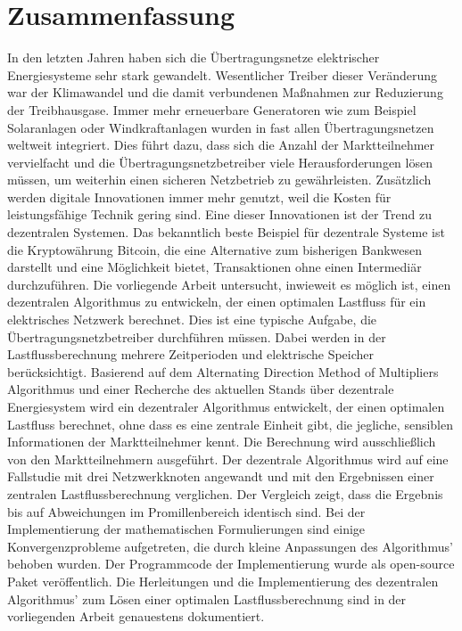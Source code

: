 \section*{Zusammenfassung}

In den letzten Jahren haben sich die Übertragungsnetze elektrischer Energiesysteme sehr stark gewandelt. Wesentlicher Treiber dieser Veränderung war der Klimawandel und die damit verbundenen Maßnahmen zur Reduzierung der Treibhausgase. Immer mehr erneuerbare Generatoren wie zum Beispiel Solaranlagen oder Windkraftanlagen wurden in fast allen Übertragungsnetzen weltweit integriert. Dies führt dazu, dass sich die Anzahl der Marktteilnehmer vervielfacht und die Übertragungsnetzbetreiber viele Herausforderungen lösen müssen, um weiterhin einen sicheren Netzbetrieb zu gewährleisten. Zusätzlich werden digitale Innovationen immer mehr genutzt, weil die Kosten für leistungsfähige Technik gering sind. Eine dieser Innovationen ist der Trend zu dezentralen Systemen. Das bekanntlich beste Beispiel für dezentrale Systeme ist die Kryptowährung Bitcoin, die eine Alternative zum bisherigen Bankwesen darstellt und eine Möglichkeit bietet, Transaktionen ohne einen Intermediär durchzuführen. Die vorliegende Arbeit untersucht, inwieweit es möglich ist, einen dezentralen Algorithmus zu entwickeln, der einen optimalen Lastfluss für ein elektrisches Netzwerk berechnet. Dies ist eine typische Aufgabe, die Übertragungsnetzbetreiber durchführen müssen. Dabei werden in der Lastflussberechnung mehrere Zeitperioden und elektrische Speicher berücksichtigt. Basierend auf dem Alternating Direction Method of Multipliers Algorithmus und einer Recherche des aktuellen Stands über dezentrale Energiesystem wird ein dezentraler Algorithmus entwickelt, der einen optimalen Lastfluss berechnet, ohne dass es eine zentrale Einheit gibt, die jegliche, sensiblen Informationen der Marktteilnehmer kennt. Die Berechnung wird ausschließlich von den Marktteilnehmern ausgeführt. Der dezentrale Algorithmus wird auf eine Fallstudie mit drei Netzwerkknoten angewandt und mit den Ergebnissen einer zentralen Lastflussberechnung verglichen. Der Vergleich zeigt, dass die Ergebnis bis auf Abweichungen im Promillenbereich identisch sind. Bei der Implementierung der mathematischen Formulierungen sind einige Konvergenzprobleme aufgetreten, die durch kleine Anpassungen des Algorithmus' behoben wurden. Der Programmcode der Implementierung wurde als open-source Paket veröffentlich. Die Herleitungen und die Implementierung des dezentralen Algorithmus' zum Lösen einer optimalen Lastflussberechnung sind in der vorliegenden Arbeit genauestens dokumentiert.